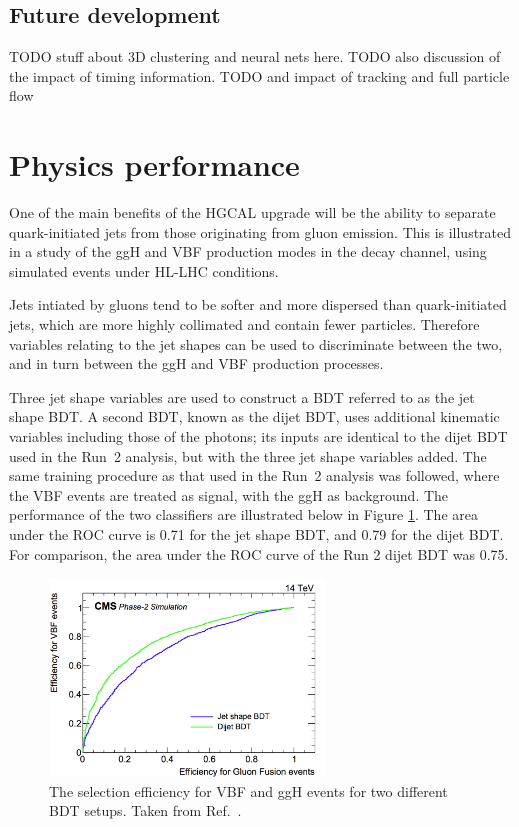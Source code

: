 \subsection{Future development}
TODO stuff about 3D clustering and neural nets here.
TODO also discussion of the impact of timing information.
TODO and impact of tracking and full particle flow

\section{Physics performance}

One of the main benefits of the HGCAL upgrade will be the ability to separate quark-initiated jets from those originating from gluon emission.
This is illustrated in a study of the ggH and VBF production modes in the \Hgg decay channel, using simulated events under HL-LHC conditions.

Jets intiated by gluons tend to be softer and more dispersed than quark-initiated jets, which are more highly collimated and contain fewer particles. 
Therefore variables relating to the jet shapes can be used to discriminate between the two, and in turn between the ggH and VBF production processes.

Three jet shape variables are used to construct a BDT referred to as the jet shape BDT.
A second BDT, known as the dijet BDT, uses additional kinematic variables including those of the photons; 
its inputs are identical to the dijet BDT used in the Run~2 analysis, but with the three jet shape variables added.
The same training procedure as that used in the Run~2 analysis was followed, 
where the VBF events are treated as signal, with the ggH as background.
The performance of the two classifiers are illustrated below in Figure \ref{fig:hgcal_VBFvsGGH}.
The area under the ROC curve is 0.71 for the jet shape BDT, and 0.79 for the dijet BDT.
For comparison, the area under the ROC curve of the Run 2 dijet BDT was 0.75.

\begin{figure}[h!]
  \centering
  \includegraphics[width=0.65\textwidth]{Figures/HGCAL/VBFvsGGH.png}
  \caption{The selection efficiency for VBF and ggH events for two different BDT setups. Taken from Ref.~\cite{HGCAL}.}
  \label{fig:hgcal_VBFvsGGH}
\end{figure}

